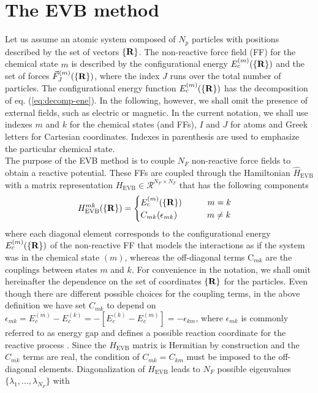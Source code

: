 \section{The EVB method}\label{sec:evb}
Let us assume an atomic system composed of $N_{p}$ particles with positions described by the set  of vectors $\{\bf R\}$. The non-reactive force field (FF) for the chemical state $m$ is described by the configurational energy $E_{c}^{(m)}(\{\bf R\})$ and the set of forces $\vec{F}_{J}^{(m)}(\{\bf R\})$, where the index $J$ runs over the total number of particles. The configurational energy function $E_{c}^{(m)}(\{ {\bf R} \})$ has the decomposition of eq. (\ref{eq:decomp-ene}). In the following, however, we shall omit the presence of external fields, such as electric or magnetic. In the current notation, we shall use indexes $m$ and $k$ for the chemical states (and FFs), $I$ and $J$ for atoms and Greek letters for Cartesian coordinates. Indexes in parenthesis are used to emphasize the particular chemical state.\\
The purpose of the EVB method is to couple $N_F$ non-reactive force fields to obtain a reactive potential. These FFs are coupled through the Hamiltonian $\hat{H}_{\text{EVB}}$ with a matrix representation $H_{\text{EVB}} \in \mathcal{R}^{N_F \times N_F}$ that has the following components
\begin{equation}\label{eq:evbmatrix}
H^{mk}_{\text{EVB}}(\{\bf{R}\})=\begin{cases} E_{c}^{(m)}(\{{\bf R}\})               \,\,\,\,\,\,\,\,\,\,\,\,\,\,\,\,\,\,  m=k   \\
                                                                   C_{mk}(\epsilon_{mk})                     \,\,\,\,\,\,\,\,\,\,\,\,\,\,\,\,\,\,\,\,\,   m \ne k 
                                              \end{cases}
\end{equation}
where each diagonal element corresponds to the configurational energy $E_{c}^{(m)}(\{ {\bf R} \})$ of the non-reactive FF that models the interactions as if the system was in the chemical state $(m)$, whereas the off-diagonal terms C$_{mk}$ are the couplings between states $m$ and $k$. For convenience in the notation, we shall omit hereinafter the dependence on the set of coordinates $\{{\bf R}\}$ for the particles. Even though there are different possible choices for the coupling terms, in the above definition we have set $C_{mk}$ to depend on $\epsilon_{mk}=E_{c}^{(m)}-E_{c}^{(k)}=-[E_{c}^{(k)}-E_{c}^{(m)}]=-\epsilon_{km}$, where $\epsilon_{mk}$ is commonly referred to as energy gap and defines a possible reaction coordinate for the reactive process \cite{mones2009}. Since the $H_{\text{EVB}}$ matrix is Hermitian by construction and the $C_{mk}$ terms are real, the condition of $C_{mk}=C_{km}$ must be imposed to the off-diagonal elements. Diagonalization of $H_{\text{EVB}}$ leads to $N_F$ possible eigenvalues $\{\lambda_1,...,\lambda_{N_{F}}\}$ with
